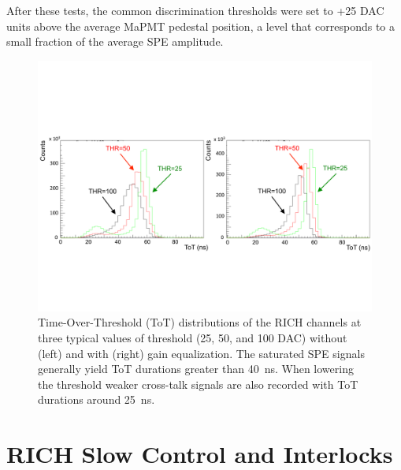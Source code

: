 \documentclass[5p,times,twocolumn]{elsarticle}
\begin{document}
After these tests, the common discrimination thresholds were set to +25 DAC units above the average MaPMT
pedestal position, a level that corresponds to a small fraction of the average SPE amplitude.

\begin{figure}[t]
\begin{center}
\includegraphics[width=1.0\columnwidth]{Figure6.pdf}
\end{center}
\caption{Time-Over-Threshold (ToT) distributions of the RICH channels at three typical values of threshold (25, 50,
  and 100 DAC) without (left) and with (right) gain equalization. The saturated SPE signals generally yield ToT durations
  greater than 40~ns. When lowering the threshold weaker cross-talk signals are also recorded with ToT durations
  around 25~ns.}
\label{Fig:Equali}
\end{figure}

\section{RICH Slow Control and Interlocks}
\label{sec:SlowControl}
\end{document}
